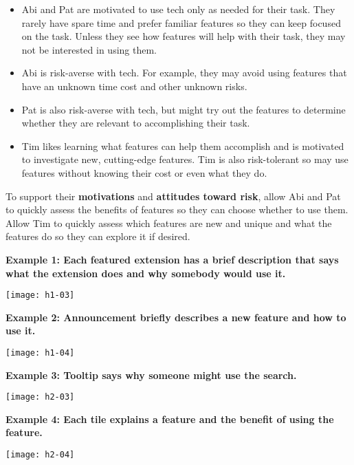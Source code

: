 \begin{itemize}
\item Abi and Pat are motivated to use tech only as needed for their task. They rarely have spare time and prefer familiar features so they can keep focused on the task. Unless they see how features will help with their task, they may not be interested in using them.
\item Abi is risk-averse with tech. For example, they may avoid using features that have an unknown time cost and other unknown risks.
\item Pat is also risk-averse with tech, but might try out the features to determine whether they are relevant to accomplishing their task.
\item Tim likes learning what features can help them accomplish and is motivated to investigate new, cutting-edge features. Tim is also risk-tolerant so may use features without knowing their cost or even what they do.
\end{itemize}

\noindent To support their \textbf{motivations} and \textbf{attitudes toward risk}, allow Abi and Pat to quickly assess the benefits of features so they can choose whether to use them. Allow Tim to quickly assess which features are new and unique and what the features do so they can explore it if desired.

\spacer
\noindent\textbf{Example 1: Each featured extension has a brief description that says what the extension does and why somebody would use it.}
\begin{center}
\noindent\texttt{[image: h1-03]}
\end{center}

\noindent\textbf{Example 2: Announcement briefly describes a new feature and how to use it.}
\begin{center}
\noindent\texttt{[image: h1-04]}
\end{center}

\noindent\textbf{Example 3: Tooltip says why someone might use the search.}
\begin{center}
\noindent\texttt{[image: h2-03]}
\end{center}

\noindent\textbf{Example 4: Each tile explains a feature and the benefit of using the feature.}
\begin{center}
\noindent\texttt{[image: h2-04]}
\end{center}

